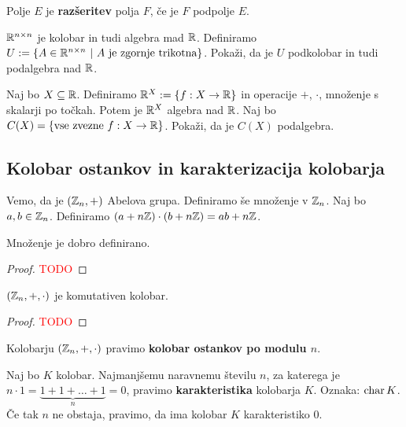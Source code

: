 \begin{definicija}
    Polje $E$ je \textbf{razšeritev} polja $F$, če je $F$ podpolje $E$.
\end{definicija}

\begin{primer}
    $\mathbb{R}^{n \times n}$ je kolobar in tudi algebra mad $\mathbb{R}$. Definiramo $U := \left\{A \in \mathbb{R}^{n \times n} \ | \ A \text{ je zgornje trikotna}\right\}$. Pokaži, da je $U$ podkolobar in tudi podalgebra nad $\mathbb{R}$.
\end{primer}

\begin{primer}
    Naj bo $X \subseteq \mathbb{R}$. Definiramo $\mathbb{R}^X := \left\{f: X \to \mathbb{R}\right\}$ in operacije $+$, $\cdot$, množenje s skalarji po točkah. Potem je $\mathbb{R}^X$ algebra nad $\mathbb{R}$. Naj bo $C(X) = \left\{\text{vse zvezne } f: X \to \mathbb{R}\right\}$. Pokaži, da je $C(X)$ podalgebra.
\end{primer}

\subsection{Kolobar ostankov in karakterizacija kolobarja}
Vemo, da je $(\mathbb{Z}_n, +)$ Abelova grupa. Definiramo še množenje v $\mathbb{Z}_n$. Naj bo $a, b \in \mathbb{Z}_n$. Definiramo $(a+n\mathbb{Z}) \cdot (b + n\mathbb{Z}) = ab + n\mathbb{Z}$.

\begin{lema}
    Množenje je dobro definirano.
\end{lema}

\begin{proof}
    \textcolor{red}{TODO}
\end{proof}

\begin{trditev}
    $(\mathbb{Z}_n, +, \cdot)$ je komutativen kolobar.
\end{trditev}

\begin{proof}
    \textcolor{red}{TODO}
\end{proof}

\begin{definicija}
    Kolobarju $(\mathbb{Z}_n, +, \cdot)$ pravimo \textbf{kolobar ostankov po modulu $n$}.
\end{definicija}

\begin{definicija}
    Naj bo $K$ kolobar. Najmanjšemu naravnemu številu $n$, za katerega je $n \cdot 1 = \underbrace{1 + 1 + \ldots + 1}_n = 0$, pravimo \textbf{karakteristika} kolobarja $K$. Oznaka: $\operatorname{char} K$. Če tak $n$ ne obstaja, pravimo, da ima kolobar $K$ karakteristiko $0$.
\end{definicija}


